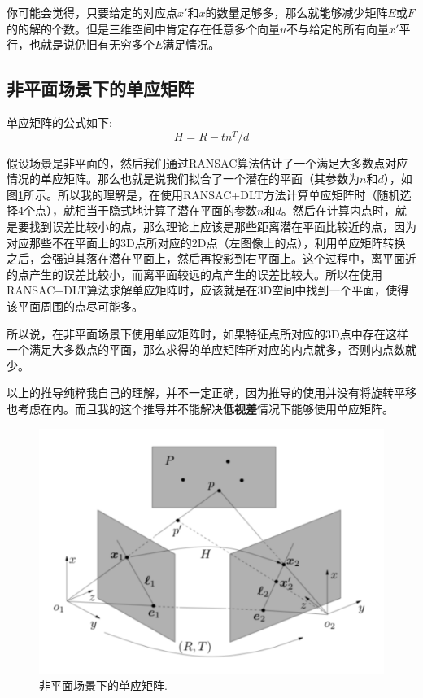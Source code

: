\begin{note}
你可能会觉得，只要给定的对应点$x'$和$x$的数量足够多，那么就能够减少矩阵$E$或$F$的的解的个数。但是三维空间中肯定存在任意多个向量$u$不与给定的所有向量$x'$平行，也就是说仍旧有无穷多个$E$满足情况。
\end{note}




\subsection{非平面场景下的单应矩阵}
单应矩阵的公式如下:
\begin{equation}
	H = R - tn^T / d
\end{equation}

假设场景是非平面的，然后我们通过RANSAC算法估计了一个满足大多数点对应情况的单应矩阵。那么也就是说我们拟合了一个潜在的平面（其参数为$n$和$d$），如图\ref{fig:nonplanar_homography}所示。所以我的理解是，在使用RANSAC+DLT方法计算单应矩阵时（随机选择4个点），就相当于隐式地计算了潜在平面的参数$n$和$d$。然后在计算内点时，就是要找到误差比较小的点，那么理论上应该是那些距离潜在平面比较近的点，因为对应那些不在平面上的3D点所对应的2D点（左图像上的点），利用单应矩阵转换之后，会强迫其落在潜在平面上，然后再投影到右平面上。这个过程中，离平面近的点产生的误差比较小，而离平面较远的点产生的误差比较大。所以在使用RANSAC+DLT算法求解单应矩阵时，应该就是在3D空间中找到一个平面，使得该平面周围的点尽可能多。


所以说，在非平面场景下使用单应矩阵时，如果特征点所对应的3D点中存在这样一个满足大多数点的平面，那么求得的单应矩阵所对应的内点就多，否则内点数就少。

\begin{note}
	以上的推导纯粹我自己的理解，并不一定正确，因为推导的使用并没有将旋转平移也考虑在内。而且我的这个推导并不能解决\textbf{低视差}情况下能够使用单应矩阵。
\end{note}

\begin{figure}[h]%
	\centering  %
	\includegraphics[width=0.6\linewidth]{image/Multiview-Geometry-Base/nonplanar_homography.png}  %
	\caption{非平面场景下的单应矩阵.}  %
	\label{fig:nonplanar_homography}   %
\end{figure}



